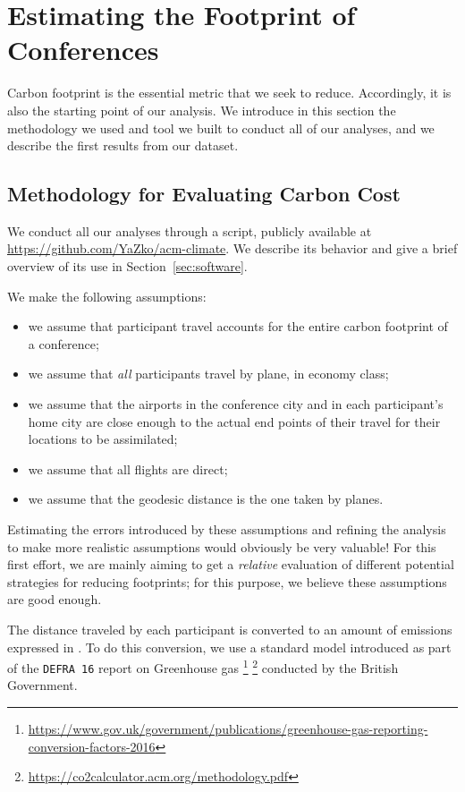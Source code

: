 \section{Estimating the Footprint of Conferences}
\label{sec:footprint}

Carbon footprint is the essential metric that we seek to reduce.
Accordingly, it is also the starting point of our analysis.  We introduce in
this section the methodology we used and tool we built to conduct all of our
analyses, and we describe the first results from our dataset.

\subsection{Methodology for Evaluating Carbon Cost}
\label{sec:methodo}

We conduct all our analyses through a \python{} script, publicly available at
\url{https://github.com/YaZko/acm-climate}. We describe its behavior and give
a brief overview of its use in Section~\ref{sec:software}.

We make the following assumptions:
\begin{itemize}
\item we assume that participant travel accounts for the entire carbon
footprint of a conference;
\item we assume that \emph{all} participants travel by plane, in economy
class; 
\item we assume that the airports in the conference city and in each
participant's home city are close enough to the actual end points of their
travel for their locations to be assimilated;
\item we assume that all flights are direct;
\item we assume that the geodesic distance is the one taken by planes.
\end{itemize}
Estimating the errors introduced by these assumptions and refining the
analysis to make more realistic assumptions would obviously be very
valuable! 
%
For this first effort, we are mainly aiming to get a 
{\em relative} evaluation of different potential strategies for reducing
footprints; for this purpose, we believe these assumptions are good enough. 

The distance traveled by each participant is converted to an amount of
emissions expressed in \gaz. To do this conversion, we use a standard model
introduced as part of the \texttt{DEFRA 16} report on Greenhouse gas
\footnote{\url{https://www.gov.uk/government/publications/greenhouse-gas-reporting-conversion-factors-2016}}
\footnote{\url{https://co2calculator.acm.org/methodology.pdf}} conducted by
the British Government.

